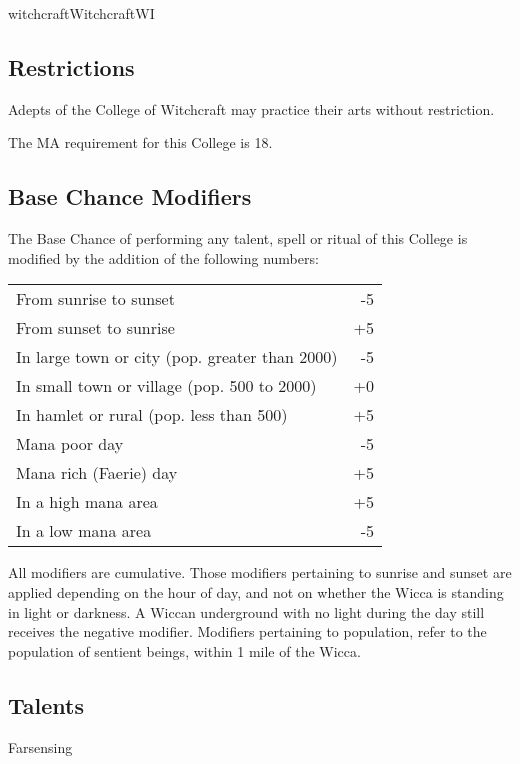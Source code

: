 \begin{college}[1.1]{witchcraft}{Witchcraft}{WI}
\subsection{Restrictions}

Adepts of the College of Witchcraft may practice their arts without
restriction.

The MA requirement for this College is 18.

\subsection{Base Chance Modifiers}

The Base Chance of performing any talent, spell or ritual of this
College is modified by the addition of the following numbers:

\begin{tabularx}{\linewidth}{Xr}
From sunrise to sunset				& -5 \\
From sunset to sunrise				& +5 \\
In large town or city (pop. greater than 2000) & -5 \\
In small town or village (pop. 500 to 2000)	& +0 \\
In hamlet or rural (pop. less than 500)		& +5 \\
Mana poor day					& -5 \\
Mana rich (Faerie) day				& +5 \\
In a high mana area				& +5 \\
In a low mana area				& -5 \\
\end{tabularx}

All modifiers are cumulative.  Those modifiers pertaining to sunrise
and sunset are applied depending on the hour of day, and not on
whether the Wicca is standing in light or darkness.  A Wiccan
underground with no light during the day still receives the negative
modifier.  Modifiers pertaining to population, refer to the population
of sentient beings, within 1 mile of the Wicca.

\subsection{Talents}

\begin{talent}[T-1]{Farsensing}


\end{talent}
\end{college}
